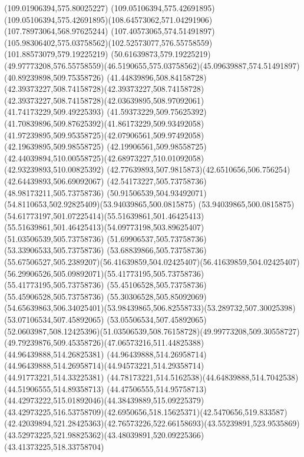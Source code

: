 {{		\lineto(109.01906394,575.80025227)
		\lineto(109.05106394,575.42691895)
		\curveto(109.05106394,575.42691895)(108.64573062,571.04291906)(107.78973064,568.97625244)
		\lineto(107.40573065,574.51491897)
		\curveto(105.98306402,575.03758562)(102.52573077,576.55758559)(101.88573079,579.19225219)
		\lineto(50.61639873,579.19225219)
		\curveto(49.97773208,576.55758559)(46.5190655,575.03758562)(45.09639887,574.51491897)
		\closepath
		\moveto(40.89239898,509.75358726)
		\curveto(41.44839896,508.84158728)(42.39373227,508.74158728)(42.39373227,508.74158728)
		\curveto(42.39373227,508.74158728)(42.03639895,508.97092061)(41.74173229,509.49225393)
		\curveto(41.59373229,509.75625392)(41.70839896,509.87625392)(41.86173229,509.93492058)
		\curveto(41.97239895,509.95358725)(42.07906561,509.97492058)(42.19639895,509.98558725)
		\lineto(42.19906561,509.98558725)
		\curveto(42.44039894,510.00558725)(42.68973227,510.01092058)(42.93239893,510.00825392)
		\curveto(42.77639893,507.9815873)(42.6510656,506.756254)(42.64439893,506.69092067)
		\lineto(42.54173227,505.73758736)
		\lineto(48.98173211,505.73758736)
		\curveto(50.91506539,504.93492071)(54.8110653,502.92825409)(53.94039865,500.0815875)
		\curveto(53.94039865,500.0815875)(54.61773197,501.07225414)(55.51639861,501.46425413)
		\curveto(55.51639861,501.46425413)(54.09773198,503.89625407)(51.03506539,505.73758736)
		\lineto(51.69906537,505.73758736)
		\lineto(53.33906533,505.73758736)
		\lineto(53.68839866,505.73758736)
		\curveto(55.67506527,505.2389207)(56.41639859,504.02425407)(56.41639859,504.02425407)
		\curveto(56.29906526,505.09892071)(55.41773195,505.73758736)(55.41773195,505.73758736)
		\lineto(55.45106528,505.73758736)
		\lineto(55.45906528,505.73758736)
		\lineto(55.30306528,505.85092069)
		\curveto(54.65639863,506.34025401)(53.98439865,506.82558733)(53.289732,507.30025398)
		\lineto(53.07106534,507.45892065)
		\lineto(53.05506534,507.45892065)
		\curveto(52.0603987,508.12425396)(51.03506539,508.76158728)(49.99773208,509.30558727)
		\curveto(49.79239876,509.45358726)(47.06573216,511.44825388)(44.96439888,514.26825381)
		\lineto(44.96439888,514.26958714)
		\curveto(44.96439888,514.26958714)(44.94573221,514.29358714)(44.91773221,514.33225381)
		\curveto(44.78173221,514.5162538)(44.64839888,514.7042538)(44.51906555,514.89358713)
		\curveto(44.47506555,514.95758713)(44.42973222,515.01892046)(44.38439889,515.09225379)
		\curveto(43.42973225,516.53758709)(42.6950656,518.15625371)(42.5470656,519.833587)
		\curveto(42.42039894,521.28425363)(42.76573226,522.66158693)(43.55239891,523.9535869)
		\curveto(43.52973225,521.98825362)(43.48039891,520.09225366)(43.41373225,518.33758704)
}}
